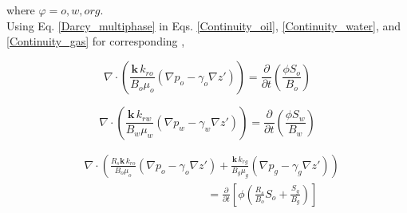 \documentclass{llncs}
\numberwithin{equation}{section}
\numberwithin{figure}{section}
\numberwithin{table}{section}
\begin{document}
    where $\varphi = o, w, or g$.\\

    Using Eq. \ref{Darcy_multiphase} in Eqs. \ref{Continuity_oil}, \ref{Continuity_water}, and \ref{Continuity_gas} for corresponding ,

    \begin{equation}
    \nabla \cdot \left( \frac{\mathbf{k}\,{{k}_{ro}}}{{{B}_{o}}{{\mu }_{o}}}\left( \nabla {{p}_{o}}-{{\gamma }_{o}}\nabla z' \right) \right)=\frac{\partial }{\partial t}\left( \frac{\phi {{S}_{o}}}{{{B}_{o}}} \right)
    \label{Continuity_oil_Darcy}
    \end{equation}

    \begin{equation}
    \nabla \cdot \left( \frac{\mathbf{k}\,{{k}_{rw}}}{{{B}_{w}}{{\mu }_{w}}}\left( \nabla {{p}_{w}}-{{\gamma }_{w}}\nabla z' \right) \right)=\frac{\partial }{\partial t}\left( \frac{\phi {{S}_{w}}}{{{B}_{w}}} \right)
    \label{Continuity_water_Darcy}
    \end{equation}

    \begin{equation}
    \begin{split}
    & \nabla \cdot \left( \frac{{{R}_{s}}\mathbf{k}\,{{k}_{ro}}}{{{B}_{o}}{{\mu }_{o}}}\left( \nabla {{p}_{o}}-{{\gamma }_{o}}\nabla z' \right)+\frac{\mathbf{k}\,{{k}_{rg}}}{{{B}_{g}}{{\mu }_{g}}}\left( \nabla {{p}_{g}}-{{\gamma }_{g}}\nabla z' \right) \right) \\
    & \quad \quad \quad \quad \quad \quad \quad \quad \quad \quad \quad =\frac{\partial }{\partial t}\left[ \phi \left( \frac{{{R}_{s}}}{{{B}_{o}}}{{S}_{o}}+\frac{{{S}_{g}}}{{{B}_{g}}} \right) \right] \\
    \end{split}
    \label{Continuity_gas_Darcy}
    \end{equation}
\end{document}

